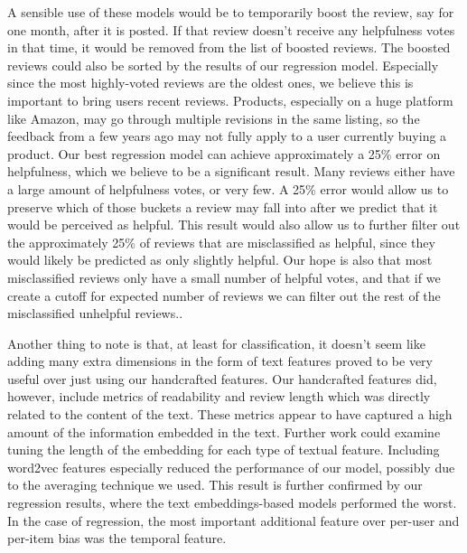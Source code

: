 \documentclass[final]{cvpr}
\begin{document}
A sensible use of these models would be to temporarily boost the review, say for one month, after it is posted. If that review doesn't receive any helpfulness votes in that time, it would be removed from the list of boosted reviews. The boosted reviews could also be sorted by the results of our regression model. Especially since the most highly-voted reviews are the oldest ones, we believe this is important to bring users recent reviews. Products, especially on a huge platform like Amazon, may go through multiple revisions in the same listing, so the feedback from a few years ago may not fully apply to a user currently buying a product. Our best regression model can achieve approximately a 25\% error on helpfulness, which we believe to be a significant result. Many reviews either have a large amount of helpfulness votes, or very few. A 25\% error would allow us to preserve which of those buckets a review may fall into after we predict that it would be perceived as helpful. This result would also allow us to further filter out the approximately 25\% of reviews that are misclassified as helpful, since they would likely be predicted as only slightly helpful. Our hope is also that most misclassified reviews only have a small number of helpful votes, and that if we create a cutoff for expected number of reviews we can filter out the rest of the misclassified unhelpful reviews..

Another thing to note is that, at least for classification, it doesn't seem like adding many extra dimensions in the form of text features proved to be very useful over just using our handcrafted features. Our handcrafted features did, however, include metrics of readability and review length which was directly related to the content of the text. These metrics appear to have captured a high amount of the information embedded in the text. Further work could examine tuning the length of the embedding for each type of textual feature. Including word2vec features especially reduced the performance of our model, possibly due to the averaging technique we used. This result is further confirmed by our regression results, where the text embeddings-based models performed the worst. In the case of regression, the most important additional feature over per-user and per-item bias was the temporal feature.



{\small



}
\end{document}
